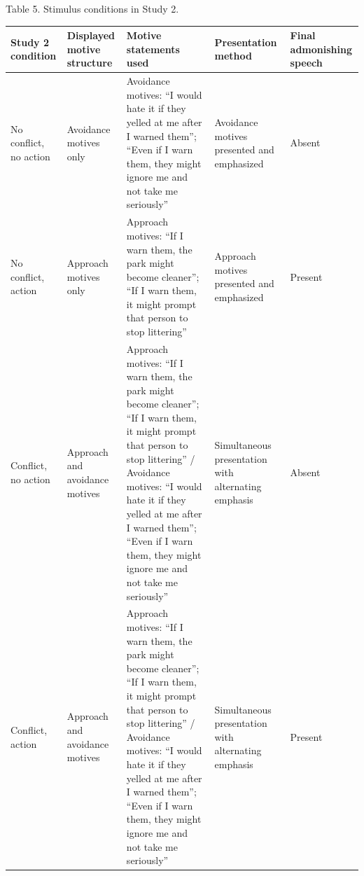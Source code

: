 Table 5. Stimulus conditions in Study 2.

{\def\LTcaptype{none} %
\begin{longtable}[]{@{}
  >{\raggedright\arraybackslash}p{}
  >{\raggedright\arraybackslash}p{}
  >{\raggedright\arraybackslash}p{}
  >{\raggedright\arraybackslash}p{}
  >{\raggedright\arraybackslash}p{}@{}}
\toprule\noalign{}
\begin{minipage}[b]{\linewidth}\raggedright
Study 2 condition
\end{minipage} & \begin{minipage}[b]{\linewidth}\raggedright
Displayed motive structure
\end{minipage} & \begin{minipage}[b]{\linewidth}\raggedright
Motive statements used
\end{minipage} & \begin{minipage}[b]{\linewidth}\raggedright
Presentation method
\end{minipage} & \begin{minipage}[b]{\linewidth}\raggedright
Final admonishing speech
\end{minipage} \\
\midrule\noalign{}
\endhead
\bottomrule\noalign{}
\endlastfoot
No conflict, no action & Avoidance motives only & Avoidance motives: ``I
would hate it if they yelled at me after I warned them''; ``Even if I
warn them, they might ignore me and not take me seriously'' & Avoidance
motives presented and emphasized & Absent \\
No conflict, action & Approach motives only & Approach motives: ``If I
warn them, the park might become cleaner''; ``If I warn them, it might
prompt that person to stop littering'' & Approach motives presented and
emphasized & Present \\
Conflict, no action & Approach and avoidance motives & Approach motives:
``If I warn them, the park might become cleaner''; ``If I warn them, it
might prompt that person to stop littering'' / Avoidance motives: ``I
would hate it if they yelled at me after I warned them''; ``Even if I
warn them, they might ignore me and not take me seriously'' &
Simultaneous presentation with alternating emphasis & Absent \\
Conflict, action & Approach and avoidance motives & Approach motives:
``If I warn them, the park might become cleaner''; ``If I warn them, it
might prompt that person to stop littering'' / Avoidance motives: ``I
would hate it if they yelled at me after I warned them''; ``Even if I
warn them, they might ignore me and not take me seriously'' &
Simultaneous presentation with alternating emphasis & Present \\
\end{longtable}
}
